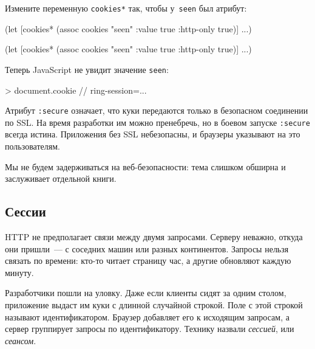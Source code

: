 \noindent
Измените переменную \verb|cookies*| так, чтобы у~\verb|seen| был атрибут:

\ifnarrow

\begin{english}
  \begin{clojure}
(let [cookies*
      (assoc cookies "seen"
        {:value true
         :http-only true})]
  ...)
  \end{clojure}
\end{english}

\else

\begin{english}
  \begin{clojure}
(let [cookies* (assoc cookies "seen"
                      {:value true :http-only true})]
  ...)
  \end{clojure}
\end{english}

\fi

Теперь JavaScript не увидит значение \verb|seen|:

\begin{english}
  \begin{js}
> document.cookie
// ring-session=...
  \end{js}
\end{english}

Атрибут \verb|:secure| означает, что куки передаются только в безопасном
соединении по SSL. На время разработки им можно пренебречь, но в боевом запуске
\verb|:secure| всегда истина. Приложения без SSL небезопасны, и браузеры
указывают на это пользователям.

Мы не будем задерживаться на веб-без\-оп\-ас\-нос\-ти: тема слишком обширна и
заслуживает отдельной книги.

\subsection{Сессии}


HTTP не предполагает связи между двумя запросами. Серверу неважно, откуда они
пришли~--- с соседних машин или разных континентов. Запросы нельзя связать по
времени: кто-то читает страницу час, а другие обновляют каждую минуту.

Разработчики пошли на уловку. Даже если клиенты сидят за одним столом,
приложение выдаст им куки с длинной случайной строкой. Поле с этой строкой
называют идентификатором. Браузер добавляет его к исходящим запросам, а сервер
группирует запросы по идентификатору. Технику назвали \emph{сессией}, или
\emph{сеансом}.

